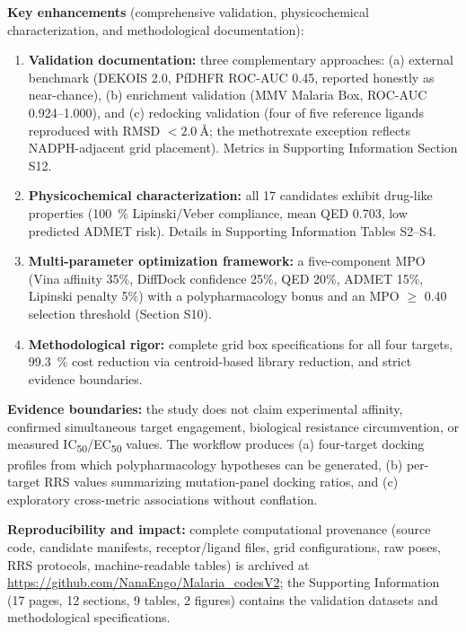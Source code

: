 \documentclass[10pt,letterpaper]{article}
\begin{document}
\noindent\textbf{Key enhancements} (comprehensive validation, physicochemical characterization, and methodological documentation):

\begin{enumerate}
\item \textbf{Validation documentation:} three complementary approaches: (a) external benchmark (DEKOIS 2.0, PfDHFR ROC-AUC \num{0.45}, reported honestly as near-chance), (b) enrichment validation (MMV Malaria Box, ROC-AUC \numrange{0.924}{1.000}), and (c) redocking validation (four of five reference ligands reproduced with RMSD $< \SI{2.0}{\angstrom}$; the methotrexate exception reflects NADPH-adjacent grid placement). Metrics in Supporting Information Section S12.

\item \textbf{Physicochemical characterization:} all 17 candidates exhibit drug-like properties (\qty{100}{\percent} Lipinski/Veber compliance, mean QED \num{0.703}, low predicted ADMET risk). Details in Supporting Information Tables S2--S4.

\item \textbf{Multi-parameter optimization framework:} a five-component MPO (Vina affinity 35\%, DiffDock confidence 25\%, QED 20\%, ADMET 15\%, Lipinski penalty 5\%) with a polypharmacology bonus and an MPO $\geq$ 0.40 selection threshold (Section S10).

\item \textbf{Methodological rigor:} complete grid box specifications for all four targets, \qty{99.3}{\percent} cost reduction via centroid-based library reduction, and strict evidence boundaries.
\end{enumerate}

\noindent\textbf{Evidence boundaries:} the study does not claim experimental affinity, confirmed simultaneous target engagement, biological resistance circumvention, or measured IC\textsubscript{50}/EC\textsubscript{50} values. The workflow produces (a) four-target docking profiles from which polypharmacology hypotheses can be generated, (b) per-target RRS values summarizing mutation-panel docking ratios, and (c) exploratory cross-metric associations without conflation.

\noindent\textbf{Reproducibility and impact:} complete computational provenance (source code, candidate manifests, receptor/ligand files, grid configurations, raw poses, RRS protocols, machine-readable tables) is archived at \url{https://github.com/NanaEngo/Malaria_codesV2}; the Supporting Information (\num{17} pages, \num{12} sections, \num{9} tables, \num{2} figures) contains the validation datasets and methodological specifications.
\end{document}
